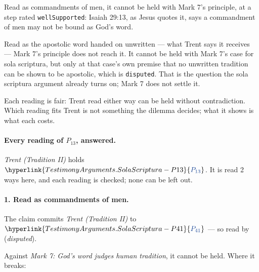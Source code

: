 \documentclass[11pt]{article}
\newcommand{\pvar}[2]{\hyperlink{#1-P#2}{\textcolor{claimlink}{P_{#2}}}}
\begin{document}
Read as commandments of men, it cannot be held with Mark 7’s principle, at a step rated \texttt{well\allowbreak{}Supported}: Isaiah 29:13, as Jesus quotes it, says a commandment of men may not be bound as God’s word.

Read as the apostolic word handed on unwritten — what Trent says it receives — Mark 7’s principle does not reach it. It cannot be held with Mark 7’s case for sola scriptura, but only at that case’s own premise that no unwritten tradition can be shown to be apostolic, which is \texttt{disputed}. That is the question the sola scriptura argument already turns on; Mark 7 does not settle it.

Each reading is fair: Trent read either way can be held without contradiction. Which reading fits Trent is not something the dilemma decides; what it shows is what each costs.

\paragraph{Every reading of \(P_{13}\), answered.} \emph{Trent (Tradition II)} holds \(\pvar{TestimonyArguments.SolaScriptura}{13}\). It is read 2 ways here, and each reading is checked; none can be left out.

\paragraph{1. Read as commandments of men.} The claim commits \emph{Trent (Tradition II)} to \(\pvar{TestimonyArguments.SolaScriptura}{41}\) --- so read by \cite[IV.x.23]{calvin-institutes-1960} (\emph{disputed}).

Against \emph{Mark 7: God’s word judges human tradition}, it cannot be held. Where it breaks:
\end{document}
